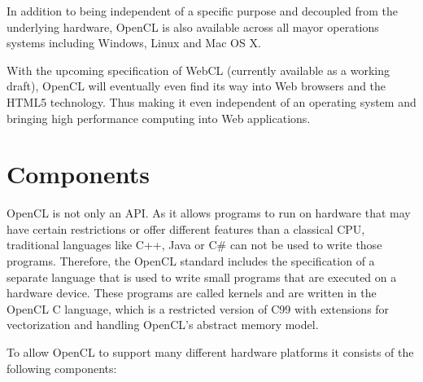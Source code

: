 In addition to being independent of a specific purpose and decoupled from the underlying hardware, OpenCL is also available across all mayor operations systems including Windows, Linux and Mac OS X.

With the upcoming specification of WebCL (currently available as a working draft), OpenCL will eventually even find its way into Web browsers and the HTML5 technology. Thus making it even independent of an operating system and bringing high performance computing into Web applications.

\section{Components}

OpenCL is not only an API. As it allows programs to run on hardware that may have certain restrictions or offer different features than a classical CPU, traditional languages like C++, Java or C\# can not be used to write those programs. Therefore, the OpenCL standard includes the specification of a separate language that is used to write small programs that are executed on a hardware device. These programs are called kernels and are written in the OpenCL C language, which is a restricted version of C99 with extensions for vectorization and handling OpenCL's abstract memory model.

To allow OpenCL to support many different hardware platforms it consists of the following components:

